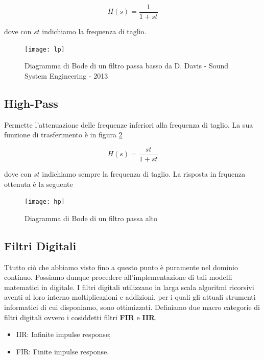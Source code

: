 \begin{equation}
H(s)=\frac{1}{1+st}
\end{equation}

dove con $st$ indichiamo la frequenza di taglio.

\begin{figure}[h]
\centering
\texttt{[image: lp]}
\caption{Diagramma di Bode di un filtro passa basso \newline \scriptsize{ da D. Davis - Sound System Engineering - 2013}}
\label{fig:lp}
\end{figure}

\subsection{High-Pass}

Permette l’attenuazione delle frequenze inferiori alla frequenza di taglio.
La sua funzione di trasferimento è in figura \ref{fig:hp}

\begin{equation}
H(s)=\frac{st}{1+st}
\end{equation}

dove con $st$ indichiamo sempre la frequenza di taglio.
La risposta in frquenza ottenuta è la seguente

\begin{figure}[htp]
\centering
\texttt{[image: hp]}
\caption{Diagramma di Bode di un filtro passa alto}
\label{fig:hp}
\end{figure}

\subsection{Filtri Digitali}

Ttutto ciò che abbiamo visto fino a questo punto è puramente nel dominio
continuo. Possiamo dunque procedere all’implementazione di tali modelli
matematici in digitale. I filtri digitali utilizzano in larga scala algoritmi
ricorsivi aventi al loro interno moltiplicazioni e addizioni, per i quali gli
attuali strumenti informatici di cui disponiamo, sono ottimizzati. Definiamo
due macro categorie di filtri digitali ovvero i cosiddetti filtri \textbf{FIR}
e \textbf{IIR}.

\begin{itemize}
\item IIR: Infinite impulse response;
\item FIR: Finite impulse response.
\end{itemize}

